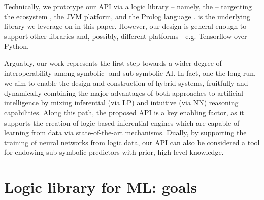 \documentclass[
]{ceurart}
\begin{document}
Technically, we prototype our API via a logic library -- namely, the \mllib{} -- targetting the \twopkt{} ecosystem \cite{2p-kt}, the JVM platform, and the Prolog language \cite{prolog50years-tplp}.
%
\deeplearningforj{} \cite{DL4J} is the underlying library we leverage on in this paper.
%
However, our design is general enough to support other libraries and, possibly, different platforms---e.g. Tensorflow \cite{tensorflow2015-whitepaper} over Python.

Arguably, our work represents the first step towards a wider degree of interoperability among symbolic- and sub-symbolic AI.
%
In fact, one the long run, we aim to enable the design and construction of hybrid systems, fruitfully and dynamically combining the major advantages of both approaches to artificial intelligence by mixing inferential (via LP) and intuitive (via NN) reasoning capabilities.
%
Along this path, the proposed API is a key enabling factor, as it supports the creation of logic-based inferential engines which are capable of learning from data via state-of-the-art mechanisms.
%
Dually, by supporting the training of neural networks from logic data, our API can also be considered a tool for endowing sub-symbolic predictors with prior, high-level knowledge.

%

\section{Logic library for ML: goals}\label{sec:goals}
\end{document}
